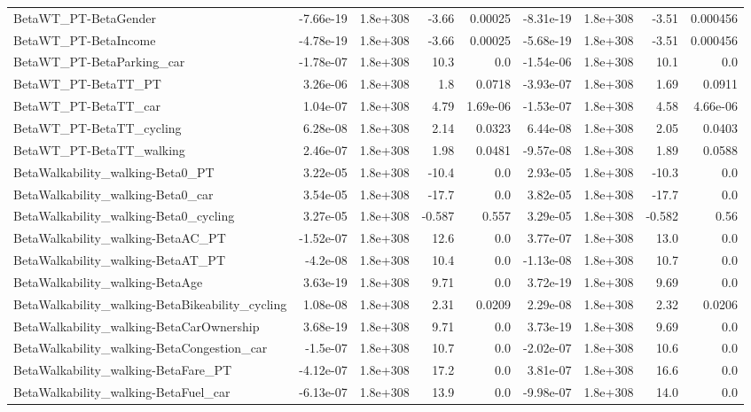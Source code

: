 \begin{tabular}{lrrrrrrrr}
BetaWT_PT-BetaGender & -7.66e-19 & 1.8e+308 & -3.66 & 0.00025 & -8.31e-19 & 1.8e+308 & -3.51 & 0.000456 \\
BetaWT_PT-BetaIncome & -4.78e-19 & 1.8e+308 & -3.66 & 0.00025 & -5.68e-19 & 1.8e+308 & -3.51 & 0.000456 \\
BetaWT_PT-BetaParking_car & -1.78e-07 & 1.8e+308 & 10.3 & 0.0 & -1.54e-06 & 1.8e+308 & 10.1 & 0.0 \\
BetaWT_PT-BetaTT_PT & 3.26e-06 & 1.8e+308 & 1.8 & 0.0718 & -3.93e-07 & 1.8e+308 & 1.69 & 0.0911 \\
BetaWT_PT-BetaTT_car & 1.04e-07 & 1.8e+308 & 4.79 & 1.69e-06 & -1.53e-07 & 1.8e+308 & 4.58 & 4.66e-06 \\
BetaWT_PT-BetaTT_cycling & 6.28e-08 & 1.8e+308 & 2.14 & 0.0323 & 6.44e-08 & 1.8e+308 & 2.05 & 0.0403 \\
BetaWT_PT-BetaTT_walking & 2.46e-07 & 1.8e+308 & 1.98 & 0.0481 & -9.57e-08 & 1.8e+308 & 1.89 & 0.0588 \\
BetaWalkability_walking-Beta0_PT & 3.22e-05 & 1.8e+308 & -10.4 & 0.0 & 2.93e-05 & 1.8e+308 & -10.3 & 0.0 \\
BetaWalkability_walking-Beta0_car & 3.54e-05 & 1.8e+308 & -17.7 & 0.0 & 3.82e-05 & 1.8e+308 & -17.7 & 0.0 \\
BetaWalkability_walking-Beta0_cycling & 3.27e-05 & 1.8e+308 & -0.587 & 0.557 & 3.29e-05 & 1.8e+308 & -0.582 & 0.56 \\
BetaWalkability_walking-BetaAC_PT & -1.52e-07 & 1.8e+308 & 12.6 & 0.0 & 3.77e-07 & 1.8e+308 & 13.0 & 0.0 \\
BetaWalkability_walking-BetaAT_PT & -4.2e-08 & 1.8e+308 & 10.4 & 0.0 & -1.13e-08 & 1.8e+308 & 10.7 & 0.0 \\
BetaWalkability_walking-BetaAge & 3.63e-19 & 1.8e+308 & 9.71 & 0.0 & 3.72e-19 & 1.8e+308 & 9.69 & 0.0 \\
BetaWalkability_walking-BetaBikeability_cycling & 1.08e-08 & 1.8e+308 & 2.31 & 0.0209 & 2.29e-08 & 1.8e+308 & 2.32 & 0.0206 \\
BetaWalkability_walking-BetaCarOwnership & 3.68e-19 & 1.8e+308 & 9.71 & 0.0 & 3.73e-19 & 1.8e+308 & 9.69 & 0.0 \\
BetaWalkability_walking-BetaCongestion_car & -1.5e-07 & 1.8e+308 & 10.7 & 0.0 & -2.02e-07 & 1.8e+308 & 10.6 & 0.0 \\
BetaWalkability_walking-BetaFare_PT & -4.12e-07 & 1.8e+308 & 17.2 & 0.0 & 3.81e-07 & 1.8e+308 & 16.6 & 0.0 \\
BetaWalkability_walking-BetaFuel_car & -6.13e-07 & 1.8e+308 & 13.9 & 0.0 & -9.98e-07 & 1.8e+308 & 14.0 & 0.0 \\

\end{tabular}
